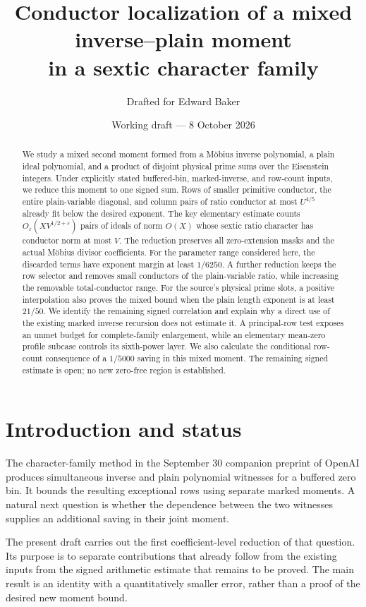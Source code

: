 \documentclass[11pt]{article}
\title{Conductor localization of a mixed inverse--plain moment\\
in a sextic character family}
\author{Drafted for Edward Baker}
\date{Working draft --- 8 October 2026}
\theoremstyle{definition}
\theoremstyle{remark}
\numberwithin{equation}{section}
\newcommand{\ee}{\varepsilon}
\begin{document}
\maketitle
\begin{abstract}
We study a mixed second moment formed from a M\"obius inverse polynomial,
a plain ideal polynomial, and a product of disjoint physical prime sums
over the Eisenstein integers. Under explicitly stated buffered-bin,
marked-inverse, and row-count inputs, we reduce this moment to one signed
sum. Rows of smaller primitive conductor, the entire plain-variable
diagonal, and column pairs of ratio conductor at most $U^{4/5}$ already
fit below the desired exponent. The key elementary estimate counts
$O_\ee(XV^{1/2+\ee})$ pairs of ideals of norm $O(X)$ whose sextic
ratio character has conductor norm at most $V$. The reduction preserves
all zero-extension masks and the actual M\"obius divisor coefficients.
For the parameter range considered here, the discarded terms have
exponent margin at least $1/6250$. A further reduction keeps the row
selector and removes small conductors of the plain-variable ratio,
while increasing the removable total-conductor range. For the source's
physical prime slots, a positive interpolation also proves the mixed
bound when the plain length exponent is at least $21/50$.
We identify the remaining signed
correlation and explain why a direct use of the existing marked inverse
recursion does not estimate it. A principal-row test exposes an unmet
budget for complete-family enlargement, while an elementary mean-zero
profile subcase controls its sixth-power layer. We also calculate the conditional
row-count consequence of a $1/5000$ saving in this mixed moment.
The remaining signed estimate is open; no new zero-free region is
established.
\end{abstract}

\section{Introduction and status}

The character-family method in the September 30 companion preprint
of OpenAI \cite{openai} produces simultaneous inverse and plain
polynomial witnesses for a buffered zero bin. It bounds the resulting
exceptional rows using separate marked moments. A natural next question
is whether the dependence between the two witnesses supplies an
additional saving in their joint moment.

The present draft carries out the first coefficient-level reduction
of that question. Its purpose is to separate contributions that already
follow from the existing inputs from the signed arithmetic estimate
that remains to be proved. The main result is an identity with a
quantitatively smaller error, rather than a proof of the desired new
moment bound.
\end{document}
